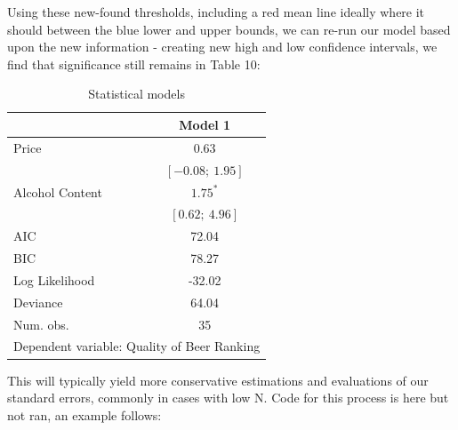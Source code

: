 \documentclass[12pt]{article}\usepackage[]{graphicx}\usepackage[]{color}
\begin{document}
\begin{flushleft}
Using these new-found thresholds, including a red mean line ideally where it should between the blue lower and upper bounds, we can re-run our model based upon the new information - creating new high and low confidence intervals, we find that significance still remains in Table 10: \\

\begin{table}[h!]
\caption{Statistical models}
\begin{center}
\begin{tabular}{l c }
\hline
 & Model 1 \\
\hline
Price           & $0.63$           \\
                & $[-0.08;\ 1.95]$ \\
Alcohol Content & $1.75^{*}$       \\
                & $[0.62;\ 4.96]$  \\
\hline
AIC             & 72.04            \\
BIC             & 78.27            \\
Log Likelihood  & -32.02           \\
Deviance        & 64.04            \\
Num. obs.       & 35               \\
\hline
\multicolumn{2}{l}{\scriptsize{Dependent variable: Quality of Beer Ranking}}
\end{tabular}
\end{center}
\end{table}


This will typically yield more conservative estimations and evaluations of our standard errors, commonly in cases with low N. Code for this process is here but not ran, an example follows:


\end{flushleft}
\end{document}
